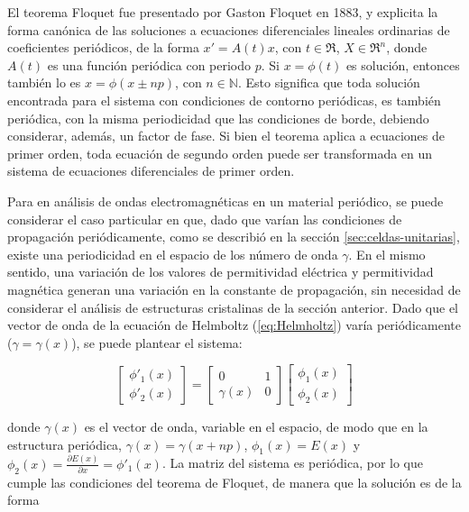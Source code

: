 El teorema Floquet fue presentado por Gaston Floquet en 1883, y explicita la forma canónica de las soluciones a ecuaciones diferenciales lineales ordinarias de coeficientes periódicos, de la forma $x' = A(t)x$, con $t \in \Re$, $X \in \Re^n$, donde $A(t)$ es una función periódica con periodo $p$. Si $x=\phi(t)$ es solución, entonces también lo es $x=\phi(x\pm np)$, con $n \in \mathbb{N}$. Esto significa que toda solución encontrada para el sistema con condiciones de contorno periódicas, es también periódica, con la misma periodicidad que las condiciones de borde, debiendo considerar, además, un factor de fase. Si bien el teorema aplica a ecuaciones de primer orden, toda ecuación de segundo orden puede ser transformada en un sistema de ecuaciones diferenciales de primer orden.

Para en análisis de ondas electromagnéticas en un material periódico, se puede considerar el caso particular en que, dado que varían las condiciones de propagación periódicamente, como se describió en la sección \ref{sec:celdas-unitarias}, existe una periodicidad en el espacio de los número de onda $\gamma$. En el mismo sentido, una variación de los valores de permitividad eléctrica y permitividad magnética generan una variación en la constante de propagación, sin necesidad de considerar el análisis de estructuras cristalinas de la sección anterior. Dado que el vector de onda de la ecuación de Helmboltz (\ref{eq:Helmholtz}) varía periódicamente ($\gamma = \gamma(x)$), se puede plantear el sistema:

\begin{equation}
	\begin{bmatrix}
		\phi'_1(x) \\
		\phi'_2(x)
	\end{bmatrix}
	=
	\begin{bmatrix}
		0 & 1 \\
		\gamma(x) & 0
	\end{bmatrix}
	\begin{bmatrix}
		\phi_1(x) \\
		\phi_2(x)
	\end{bmatrix}
\end{equation}

donde $\gamma(x)$ es el vector de onda, variable en el espacio, de modo que en la estructura periódica, $\gamma(x) = \gamma(x+n p)$, $\phi_1(x) = E(x)$ y $\phi_2(x) = \frac{\partial E(x)}{\partial x} = \phi'_1(x)$. La matriz del sistema es periódica, por lo que cumple las condiciones del teorema de Floquet, de manera que la solución es de la forma

